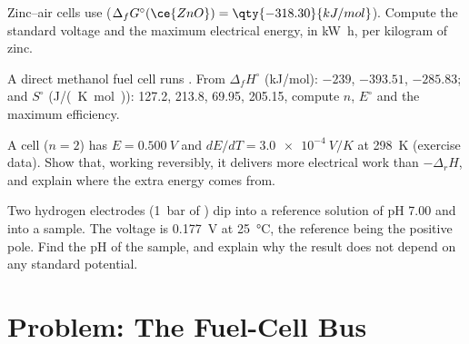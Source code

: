 \begin{exercise}[$\star\star$]\label{exo:b2:cell-thermodynamics:9}
Zinc--air cells use  ($\Delta_f G^\circ(\ce{ZnO}) =
\qty{-318.30}{kJ/mol}$). Compute the standard voltage and the maximum electrical
energy, in \unit{kW.h}, per kilogram of zinc.
\end{exercise}

\begin{exercise}[$\star\star\star$]\label{exo:b2:cell-thermodynamics:10}
A direct methanol fuel cell runs . From
$\Delta_f H^\circ$ (\unit{kJ/mol}):  $-239$,  $-393.51$,
 $-285.83$; and $S^\circ$ (\unit{J/(K.mol)}):  127.2,
 213.8,  69.95,  205.15, compute $n$, $E^\circ$ and the
maximum efficiency.
\end{exercise}

\begin{exercise}[$\star\star\star$]\label{exo:b2:cell-thermodynamics:11}
A cell ($n = 2$) has $E = \qty{0.500}{V}$ and $dE/dT = \qty{+3.0e-4}{V/K}$ at
\qty{298}{K} (exercise data). Show that, working reversibly, it delivers more
electrical work than $-\Delta_r H$, and explain where the extra energy comes from.
\end{exercise}

\begin{exercise}[$\star\star\star$]\label{exo:b2:cell-thermodynamics:12}
Two hydrogen electrodes (\qty{1}{bar} of ) dip into a reference solution of
pH 7.00 and into a sample. The voltage is \qty{0.177}{V} at \qty{25}{\degreeCelsius},
the reference being the positive pole. Find the pH of the sample, and explain
why the result does not depend on any standard potential.
\end{exercise}

\section{Problem: The Fuel-Cell Bus}

